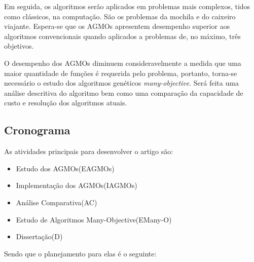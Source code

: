 \documentclass[]{article}
\begin{document}
	Em seguida, os algoritmos serão aplicados em problemas mais complexos, tidos como clássicos, na computação. São os problemas da mochila e do caixeiro viajante. Espera-se que os AGMOs apresentem desempenho superior aos algoritmos convencionais quando aplicados a problemas de, no máximo, três objetivos.
	
	O desempenho dos AGMOs diminuem consideravelmente a medida que uma maior quantidade de funções é requerida pelo problema, portanto, torna-se necessário o estudo dos algoritmos genéticos \textit{many-objective}. Será feita uma análise descritiva do algoritmo bem como uma comparação da capacidade de custo e resolução dos algoritmos atuais.
	
\subsection{Cronograma}

	As atividades principais para desenvolver o artigo são:
	
\begin{itemize}
	\item Estudo dos AGMOs(EAGMOs)
	\item Implementação dos AGMOs(IAGMOs) 
	\item Análise Comparativa(AC)
	\item Estudo de Algoritmos Many-Objective(EMany-O)
	\item Dissertação(D)
\end{itemize}
	
	Sendo que o planejamento para elas é o seguinte:
	
\end{document}
